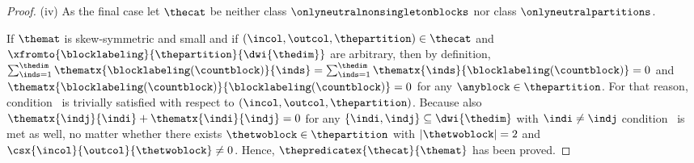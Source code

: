 \documentclass[pdftex]{sigma}
\numberwithin{equation}{section}
\begin{document}
{\begin{proof}
(iv)
 As the final case let $\thecat$ be neither class $\onlyneutralnonsingletonblocks$ nor class $\onlyneutralpartitions$.

  If $\themat$ is skew-symmetric and small and if $(\incol,\outcol,\thepartition)\in\thecat$ and $\xfromto{\blocklabeling}{\thepartition}{\dwi{\thedim}}$ are arbitrary, then by definition, $\sum_{\inds=1}^\thedim\thematx{\blocklabeling(\countblock)}{\inds}=\sum_{\inds=1}^\thedim\thematx{\inds}{\blocklabeling(\countblock)}=0$ and $\thematx{\blocklabeling(\countblock)}{\blocklabeling(\countblock)}=0$ for any  $\anyblock\in \thepartition$. For that reason, con\-di\-tion~\conditionone{} is trivially satisfied with respect to $(\incol,\outcol,\thepartition)$. Because also $\thematx{\indj}{\indi}+\thematx{\indi}{\indj}=0$ for any $\{\indi,\indj\}\subseteq\dwi{\thedim}$ with $\indi\neq \indj$ con\-di\-tion~\conditiontwo{} is met as well, no matter whether there exists  $\thetwoblock\in\thepartition$ with $|\thetwoblock|=2$ and $\csx{\incol}{\outcol}{\thetwoblock}\neq 0$. Hence, $\thepredicatex{\thecat}{\themat}$ has been proved.


\end{proof}}
\end{document}
